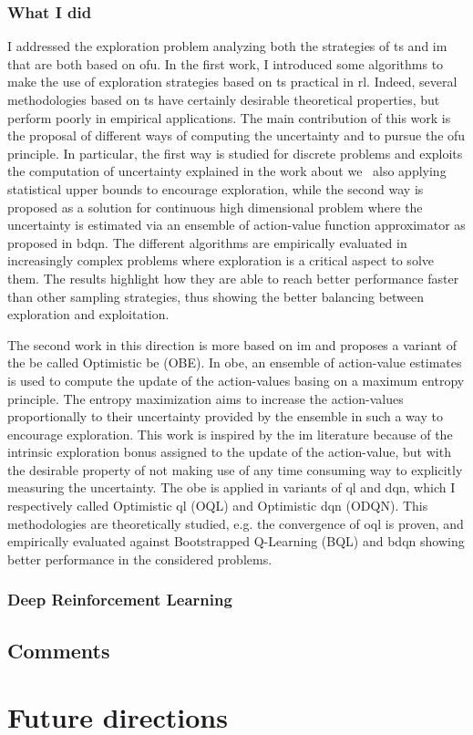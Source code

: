 \subsubsection{What I did}
I addressed the exploration problem analyzing both the strategies of \gls{ts} and \gls{im} that are both based on \gls{ofu}. In the first work, I introduced some algorithms to make the use of exploration strategies based on \gls{ts} practical in \gls{rl}. Indeed, several methodologies based on \gls{ts} have certainly desirable theoretical properties, but perform poorly in empirical applications. The main contribution of this work is the proposal of different ways of computing the uncertainty and to pursue the \gls{ofu} principle. In particular, the first way is studied for discrete problems and exploits the computation of uncertainty explained in the work about \gls{we}~\cite{deramo2016estimating} also applying statistical upper bounds to encourage exploration, while the second way is proposed as a solution for continuous high dimensional problem where the uncertainty is estimated via an ensemble of action-value function approximator as proposed in \gls{bdqn}. The different algorithms are empirically evaluated in increasingly complex problems where exploration is a critical aspect to solve them. The results highlight how they are able to reach better performance faster than other sampling strategies, thus showing the better balancing between exploration and exploitation.

The second work in this direction is more based on \gls{im} and proposes a variant of the \gls{be} called Optimistic \gls{be} (OBE). In \gls{obe}, an ensemble of action-value estimates is used to compute the update of the action-values basing on a maximum entropy principle. The entropy maximization aims to increase the action-values proportionally to their uncertainty provided by the ensemble in such a way to encourage exploration. This work is inspired by the \gls{im} literature because of the intrinsic exploration bonus assigned to the update of the action-value, but with the desirable property of not making use of any time consuming way to explicitly measuring the uncertainty. The \gls{obe} is applied in variants of \gls{ql} and \gls{dqn}, which I respectively called Optimistic \gls{ql} (OQL) and Optimistic \gls{dqn} (ODQN). This methodologies are theoretically studied, e.g. the convergence of \gls{oql} is proven, and empirically evaluated against Bootstrapped Q-Learning (BQL) and \gls{bdqn} showing better performance in the considered problems.

\subsubsection{Deep Reinforcement Learning}

\subsection{Comments}

\section{Future directions}
